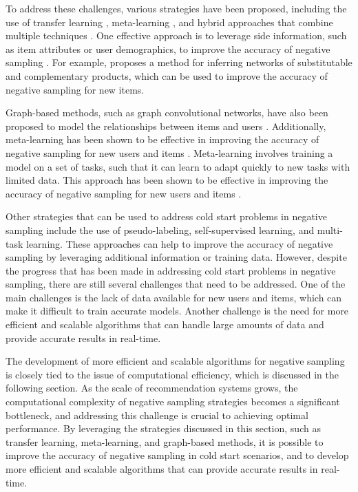 \documentclass[11pt,a4paper]{article}
\begin{document}
To address these challenges, various strategies have been proposed, including the use of transfer learning \cite{doi:10.1145/3292500.3330859}, meta-learning \cite{doi:10.1145/3466753}, and hybrid approaches that combine multiple techniques \cite{doi:10.1609/aaai.v32i1.11835}. One effective approach is to leverage side information, such as item attributes or user demographics, to improve the accuracy of negative sampling \cite{doi:10.1016/j.elerap.2019.100879}. For example, \cite{doi:10.1145/2783258.2783381} proposes a method for inferring networks of substitutable and complementary products, which can be used to improve the accuracy of negative sampling for new items.

Graph-based methods, such as graph convolutional networks, have also been proposed to model the relationships between items and users \cite{arxiv:1905.01997}. Additionally, meta-learning has been shown to be effective in improving the accuracy of negative sampling for new users and items \cite{arxiv:2206.04415}. Meta-learning involves training a model on a set of tasks, such that it can learn to adapt quickly to new tasks with limited data. This approach has been shown to be effective in improving the accuracy of negative sampling for new users and items \cite{doi:10.1145/3466753}.

Other strategies that can be used to address cold start problems in negative sampling include the use of pseudo-labeling, self-supervised learning, and multi-task learning. These approaches can help to improve the accuracy of negative sampling by leveraging additional information or training data. However, despite the progress that has been made in addressing cold start problems in negative sampling, there are still several challenges that need to be addressed. One of the main challenges is the lack of data available for new users and items, which can make it difficult to train accurate models. Another challenge is the need for more efficient and scalable algorithms that can handle large amounts of data and provide accurate results in real-time.

The development of more efficient and scalable algorithms for negative sampling is closely tied to the issue of computational efficiency, which is discussed in the following section. As the scale of recommendation systems grows, the computational complexity of negative sampling strategies becomes a significant bottleneck, and addressing this challenge is crucial to achieving optimal performance. By leveraging the strategies discussed in this section, such as transfer learning, meta-learning, and graph-based methods, it is possible to improve the accuracy of negative sampling in cold start scenarios, and to develop more efficient and scalable algorithms that can provide accurate results in real-time.
\end{document}

